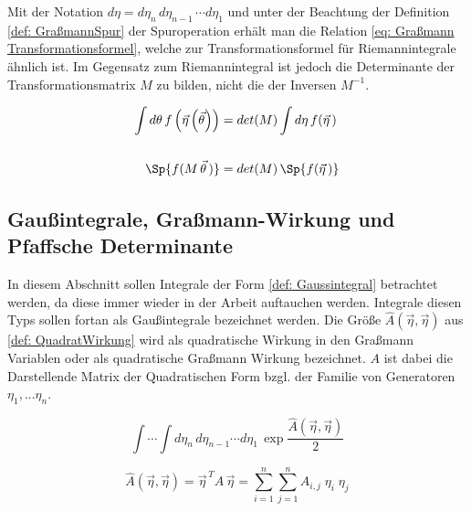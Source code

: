 \noindent Mit der Notation $ d\eta = d\eta_n\,d\eta_{n-1}\,\cdots d\eta_1 $ und unter der Beachtung der Definition \eqref{def: GraßmannSpur} der Spuroperation erhält man die Relation \eqref{eq: Graßmann Transformationsformel}, welche zur Transformationsformel für Riemannintegrale ähnlich ist. Im Gegensatz zum Riemannintegral ist jedoch die Determinante der Transformationsmatrix $M$ zu bilden, nicht die der Inversen $M^{-1}$. 

\begin{grayframe}[frametitle = {Für Variablentransformationen $\vec{\eta}\left(\vec{\theta}\right) = M\,\vec{\theta}$ gilt:}]
\begin{align} \label{eq: Graßmann Transformationsformel}
 \int d\theta\, f\left(\vec{\eta}\left(\vec{\theta}\right)\right)  &= det(M) \int d\eta\, f(\vec{\eta}\,) \\
 \nonumber \\
 \Sp{f( M\,\vec{\theta}\,)} &=  det(M) \,\Sp{f(\vec{\eta}\,)}
\end{align}
\end{grayframe}


\subsection{Gaußintegrale, Graßmann-Wirkung und Pfaffsche Determinante}

In diesem Abschnitt sollen Integrale der Form \eqref{def: Gaussintegral} betrachtet werden, da diese immer wieder in der Arbeit auftauchen werden. Integrale diesen Typs sollen fortan als Gaußintegrale bezeichnet werden. Die Größe $\hat{A}\left(\vec{\eta}, \vec{\eta}\right)$ aus \eqref{def: QuadratWirkung} wird als quadratische Wirkung in den Graßmann Variablen oder als quadratische Graßmann Wirkung bezeichnet. $A$ ist dabei die Darstellende Matrix der Quadratischen Form bzgl. der Familie von Generatoren $\eta_1, ... \eta_n$.   

\begin{equation} \label{def: Gaussintegral}
\int \cdots \int d\eta_n\,d\eta_{n-1}\cdots d\eta_1\, \exp{\frac{\hat{A}\left(\vec{\eta}, \vec{\eta}\right)}{2}}
\end{equation}

\begin{equation} \label{def: QuadratWirkung}
\hat{A}\left(\vec{\eta}, \vec{\eta}\right) = \vec{\eta}^{\,T} A\, \vec{\eta} = \sum_{i=1}^n \sum_{j=1}^n A_{i,j}\; \eta_i\; \eta_j 
\end{equation}

